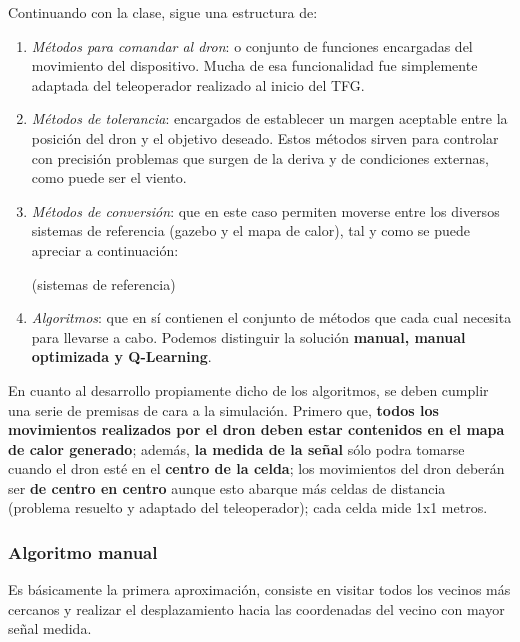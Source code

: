 Continuando con la clase, sigue una estructura de:

\begin{enumerate}
	\item \emph{Métodos para comandar al dron}: o conjunto de funciones encargadas del movimiento del dispositivo. Mucha de esa funcionalidad fue simplemente adaptada del teleoperador realizado al inicio del \ac{TFG}.
	
    \item \emph{Métodos de tolerancia}: encargados de establecer un margen aceptable entre la posición del dron y el objetivo deseado. Estos métodos sirven para controlar con precisión problemas que surgen de la deriva y de condiciones externas, como puede ser el viento.

	\item \emph{Métodos de conversión}: que en este caso permiten moverse entre los diversos sistemas de referencia (gazebo y el mapa de calor), tal y como se puede apreciar a continuación:
	
    (sistemas de referencia)\\

    \item \emph{Algoritmos}: que en sí contienen el conjunto de métodos que cada cual necesita para llevarse a cabo. Podemos distinguir la solución \textbf{manual, manual optimizada y Q-Learning}. 
\end{enumerate}

En cuanto al desarrollo propiamente dicho de los algoritmos, se deben cumplir una serie de premisas de cara a la simulación. Primero que, \textbf{todos los movimientos realizados por el dron deben estar contenidos en el mapa de calor generado}; además, \textbf{la medida de la señal} sólo podra tomarse cuando el dron esté en el \textbf{centro de la celda}; los movimientos del dron deberán ser \textbf{de centro en centro} aunque esto abarque más celdas de distancia (problema resuelto y adaptado del teleoperador); cada celda mide 1x1 metros.\\

\subsubsection{Algoritmo manual}
\label{subsec:alg-manual}

Es básicamente la primera aproximación, consiste en visitar todos los vecinos más cercanos y realizar el desplazamiento hacia las coordenadas del vecino con mayor señal medida.\\

